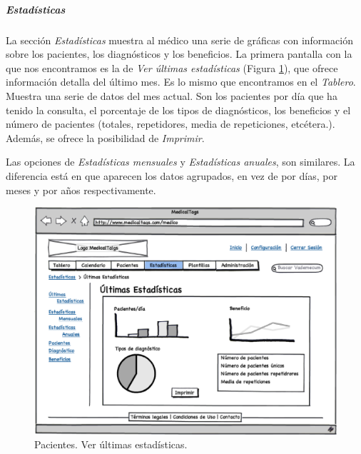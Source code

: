 \documentclass[a4paper,oneside,11pt]{book}
\begin{document}
		
		\medskip
		\subparagraph{Estadísticas} %
		\label{par:medico_estadisticas}
		
		La sección \textit{Estadísticas} muestra al médico una serie de gráficas con información sobre los pacientes, los diagnósticos y los beneficios. La primera pantalla con la que nos encontramos es la de \textit{Ver últimas estadísticas} (Figura \ref{fig:estadisticas_medico}), que ofrece información detalla del último mes. Es lo mismo que encontramos en el \textit{Tablero}. Muestra una serie de datos del mes actual. Son los pacientes por día que ha tenido la consulta, el porcentaje de los tipos de diagnósticos, los beneficios y el número de pacientes (totales, repetidores, media de repeticiones, etcétera.). Además, se ofrece la posibilidad de \textit{Imprimir}.
		
		Las opciones de \textit{Estadísticas mensuales} y \textit{Estadísticas anuales}, son similares. La diferencia está en que aparecen los datos agrupados, en vez de por días, por meses y por años respectivamente.
		
		
		
		
		\begin{figure}[H]
		  \centering
		    \includegraphics[width=12cm]{img/eps/19_Estadisticas_Medicos.eps}
		  \caption{Pacientes. Ver últimas estadísticas.}
		  \label{fig:estadisticas_medico}
		\end{figure}
		
\end{document}
